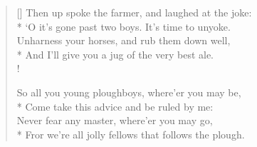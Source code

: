 \documentclass[MAIN]{subfiles}
\begin{document}
\begin{verse}[\versewidth]
Then up spoke the farmer, and laughed at the joke:\\*
`O it's gone  past two boys. It's time to unyoke.\\
Unharness your horses, and rub them down well,\\*
And I'll give you a jug of the very best ale.\\!

So all you young ploughboys, where'er you may be,\\*
Come take this advice and be ruled by me:\\
Never fear any master, where'er you may go,\\*
Fror we're all jolly fellows that follows the plough.
\end{verse}
\end{document}
